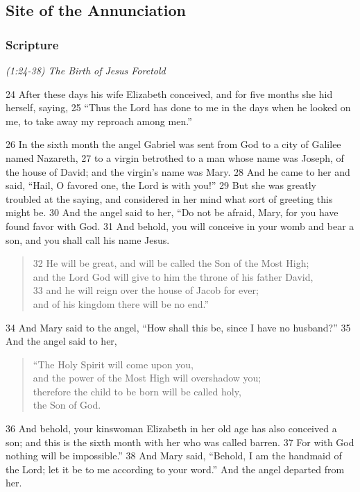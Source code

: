 \documentclass[letterpaper]{report}
\begin{document}
\clearpage
\subsection{Site of the Annunciation}
\begin{multicols}{2}
	\mbox{}
\end{multicols}
\subsubsection{Scripture}

{\centering
	\emph{(1:24-38) The Birth of Jesus Foretold}\\
}
\begin{multicols}{2}
24 After these days his wife Elizabeth conceived, and for five months she hid herself, saying, 25 “Thus the Lord has done to me in the days when he looked on me, to take away my reproach among men.”

26 In the sixth month the angel Gabriel was sent from God to a city of Galilee named Nazareth, 27 to a virgin betrothed to a man whose name was Joseph, of the house of David; and the virgin’s name was Mary. 28 And he came to her and said, “Hail, O favored one, the Lord is with you!” 29 But she was greatly troubled at the saying, and considered in her mind what sort of greeting this might be. 30 And the angel said to her, “Do not be afraid, Mary, for you have found favor with God. 31 And behold, you will conceive in your womb and bear a son, and you shall call his name Jesus.

\begin{verse}
32 He will be great, and will be called the Son of the Most High;\\
and the Lord God will give to him the throne of his father David,\\
33 and he will reign over the house of Jacob for ever;\\
and of his kingdom there will be no end.”\\
\end{verse}

34 And Mary said to the angel, “How shall this be, since I have no husband?” 35 And the angel said to her,

\begin{verse}
“The Holy Spirit will come upon you,\\
and the power of the Most High will overshadow you;\\
therefore the child to be born will be called holy,\\
the Son of God.\\
\end{verse}
36 And behold, your kinswoman Elizabeth in her old age has also conceived a son; and this is the sixth month with her who was called barren. 37 For with God nothing will be impossible.” 38 And Mary said, “Behold, I am the handmaid of the Lord; let it be to me according to your word.” And the angel departed from her.

\end{multicols}
\end{document}
